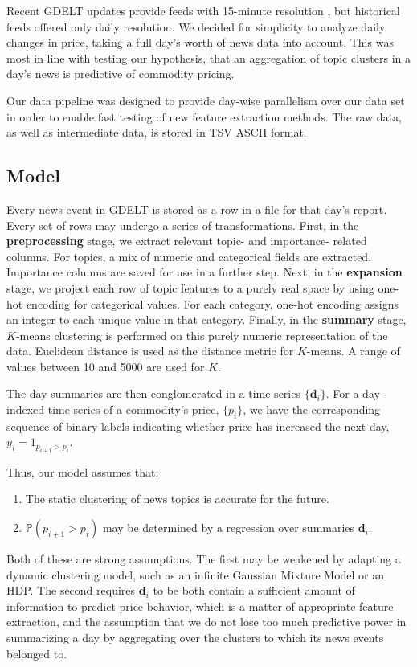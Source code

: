 
Recent GDELT updates provide feeds with 15-minute resolution \cite{GDELT2}, but historical feeds offered only daily resolution. We decided for simplicity to analyze daily changes in price, taking a full day's worth of news data into account. This was most in line with testing our hypothesis, that an aggregation of topic clusters in a day's news is predictive of commodity pricing.

Our data pipeline was designed to provide day-wise parallelism over our data set in order to enable fast testing of new feature extraction methods. The raw data, as well as intermediate data, is stored in TSV ASCII format.

\subsection{Model}

Every news event in GDELT is stored as a row in a file for that day's report. Every set of rows may undergo a series of transformations. First, in the \textbf{preprocessing} stage, we extract relevant topic- and importance- related columns. For topics, a mix of numeric and categorical fields are extracted. Importance columns are saved for use in a further step. Next, in the \textbf{expansion} stage, we project each row of topic features to a purely real space by using one-hot encoding for categorical values. For each category, one-hot encoding assigns an integer to each unique value in that category. Finally, in the \textbf{summary} stage, $K$-means clustering is performed on this purely numeric representation of the data. Euclidean distance is used as the distance metric for $K$-means. A range of values between 10 and 5000 are used for $K$.

The day summaries are then conglomerated in a time series $\{\textbf{d}_i\}$. For a day-indexed time series of a commodity's price, $\{p_i\}$, we have the corresponding sequence of binary labels indicating whether price has increased the next day, $y_i=1_{p_{i+1}>p_i}$.

Thus, our model assumes that:
\begin{enumerate}
\item The static clustering of news topics is accurate for the future.
\item $\mathbb{P}(p_{i+1}>p_i)$ may be determined by a regression over summaries $\textbf{d}_i$. 
\end{enumerate}

Both of these are strong assumptions. The first may be weakened by adapting a dynamic clustering model, such as an infinite Gaussian Mixture Model or an HDP. The second requires $\textbf{d}_i$ to be both contain a sufficient amount of information to predict price behavior, which is a matter of appropriate feature extraction, and the assumption that we do not lose too much predictive power in summarizing a day by aggregating over the clusters to which its news events belonged to.

